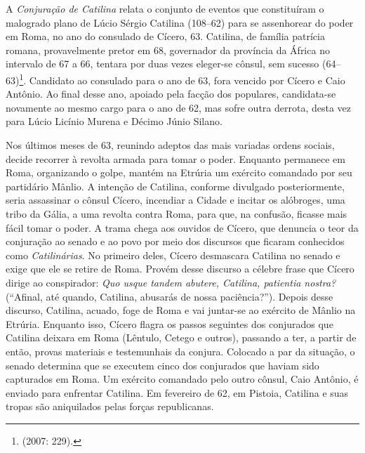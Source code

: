 




A \emph{Conjuração de Catilina} relata o conjunto de eventos que constituíram o
malogrado plano de Lúcio Sérgio Catilina (108--62) para se assenhorear do poder
em Roma, no ano do consulado de Cícero, 63. Catilina, de família patrícia
romana, provavelmente pretor  em 68, governador da província da África no
intervalo de 67 a 66, tentara por duas vezes eleger-se cônsul, sem sucesso
(64--63)\footnote{ (2007: 229).}. Candidato ao consulado para o ano de
63, fora vencido por Cícero e Caio Antônio. Ao final desse ano, apoiado pela
facção dos populares, candidata-se novamente ao mesmo cargo para o ano de 62,
mas sofre outra derrota, desta vez para Lúcio Licínio Murena e Décimo Júnio
Silano.

Nos últimos meses de 63, reunindo adeptos das mais variadas ordens sociais,
decide recorrer à revolta armada para tomar o poder. Enquanto permanece em
Roma, organizando o golpe, mantém na Etrúria um exército comandado por seu
partidário Mânlio. A intenção de Catilina, conforme divulgado posteriormente,
seria assassinar o cônsul Cícero, incendiar a Cidade e incitar os alóbroges,
uma tribo da Gália, a uma revolta contra Roma, para que, na confusão, ficasse
mais fácil tomar o poder. A trama chega aos ouvidos de Cícero, que denuncia o
teor da conjuração ao senado e ao povo por meio dos discursos que ficaram
conhecidos como \emph{Catilinárias}. No primeiro deles, Cícero desmascara
Catilina no senado e exige que ele se retire de Roma. Provém desse discurso a
célebre frase que Cícero dirige ao conspirador: \emph{Quo usque tandem abutere,
Catilina, patientia nostra? }(“Afinal, até quando, Catilina, abusarás de nossa
paciência?”).  Depois desse discurso, Catilina, acuado, foge de Roma e vai
juntar-se ao exército de Mânlio na Etrúria. Enquanto isso, Cícero flagra os
passos seguintes dos conjurados que Catilina deixara em Roma (Lêntulo, Cetego e
outros), passando a ter, a partir de então, provas materiais e testemunhais da
conjura. Colocado a par da situação, o senado determina que se executem cinco
dos conjurados que haviam sido capturados em Roma.  Um exército comandado pelo
outro cônsul, Caio Antônio, é enviado para enfrentar Catilina.  Em fevereiro de
62, em Pistoia, Catilina e suas tropas são aniquilados pelas forças
republicanas. 

